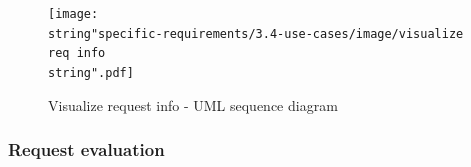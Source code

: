\clearpage{}

\begin{landscape}

\begin{figure}[H]
\begin{centering}
\texttt{[image: \\string"specific-requirements/3.4-use-cases/image/visualize req info\\string".pdf]}
\par\end{centering}

\protect\caption{Visualize request info - UML sequence diagram}
\end{figure}


\end{landscape}

\clearpage{}


\subsubsection{Request evaluation}

